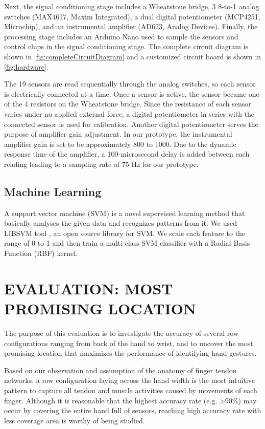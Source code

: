 \documentclass{sigchi}
\begin{document}
Next, the signal conditioning stage includes a Wheatstone bridge, 3 8-to-1 analog switches (MAX4617, Maxim Integrated), a dual digital potentiometer (MCP4251, Microchip), and an instrumental amplifier (AD623, Analog Devices). Finally, the processing stage includes an Arduino Nano used to sample the sensors and control chips in the signal conditioning stage. The complete circuit diagram is shown in \autoref{fig:completeCircuitDiagram} and a customized circuit board is shown in \autoref{fig:hardware}.

The 19 sensors are read sequentially through the analog switches, so each sensor is electrically connected at a time. Once a sensor is active, the sensor became one of the 4 resistors on the Wheatstone bridge. Since the resistance of each sensor varies under no applied external force, a digital potentiometer in series with the connected sensor is used for calibration. Another digital potentiometer serves the purpose of amplifier gain adjustment. In our prototype, the instrumental amplifier gain is set to be approximately 800 to 1000. Due to the dynamic response time of the amplifier, a 100-microsecond delay is added between each reading leading to a sampling rate of 75 Hz for our prototype.


\subsection{Machine Learning}
A support vector machine (SVM) is a novel supervised learning method that basically analyses the given data and recognizes patterns from it.
We used LIBSVM tool \cite{CC01a}, an open source library for SVM. 
We scale each feature to the range of 0 to 1 and then train a multi-class SVM classifier with a Radial Basis Function (RBF) kernel.


\section{EVALUATION: MOST PROMISING LOCATION}

The purpose of this evaluation is to investigate the accuracy of several row configurations ranging from back of the hand to wrist, and to uncover the most promising location that maximizes the performance of identifying hand gestures. 

Based on our observation and assumption of the anatomy of finger tendon networks, a row configuration laying across the hand width is the most intuitive pattern to capture all tendon and muscle activities caused by movements of each finger. Although it is reasonable that the highest accuracy rate (e.g. \textgreater90\%) may occur by covering the entire hand full of sensors, reaching high accuracy rate with less coverage area is worthy of being studied.
\end{document}
